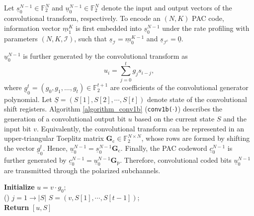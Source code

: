 \documentclass[12pt, draftclsnofoot, peerreview, onecolumn]{IEEEtran}
\theoremstyle{noparent}
\begin{document}
Let $\underline{s}_{0}^{N-1} \in \mathbb{F}_{2}^{N}$ and $\underline{u}_{0}^{N-1} \in \mathbb{F}_{2}^{N}$
denote the input and output vectors of the convolutional transform, respectively.
To encode an $(N,K)$ PAC code, information vector $\underline{m}_{1}^{K}$ is
first embedded into $\underline{s}_{0}^{N-1}$ under the rate profiling with 
parameters $(N,K,\mathcal{I})$, such that
$\underline{s}_{\mathcal{I}}=\underline{m}_{0}^{K-1}$ and $\underline{s}_{\mathcal{I}^c}=\underline{0}$.

$\underline{u}_{0}^{N-1}$ is further generated 
by the convolutional transform as 
\begin{equation}
    u_i=\sum_{j=0}^{t} g_j s_{i-j},
    \label{1_bit_convolutional}
\end{equation}
where $\underline{g}_{0}^{t}=\left(g_{0}, g_{1}, \ldots, g_{t}\right)\in \mathbb{F}_{2}^{t+1}$ 
are coefficients of the convolutional generator polynomial.
Let $\underline{S}=(S[1], S[2], \cdots, S[t])$ denote state of the convolutional shift registers.
Algorithm \ref{algorithm_conv1b} (\texttt{conv1b($\cdot$)}) describes the generation of 
a convolutional output bit $u$ based on the current state $S$ and the input bit $v$.
Equivalently, the convolutional transform can be represented in 
an upper-triangular Toeplitz matrix $\mathbf{G}_{\mathrm{c}}\in \mathbb{F}_{2}^{N \times N}$,
whose rows are formed by shifting the vector $\underline{g}_{0}^{t}$.
Hence, $\underline{u}_{0}^{N-1}=\underline{s}_{0}^{N-1} \mathbf{G}_{\mathrm{c}}$.
Finally, the PAC codeword $\underline{c}_{0}^{N-1}$ is further generated by
$\underline{c}_{0}^{N-1}=\underline{u}_{0}^{N-1} \mathbf{G}_{\mathrm{p}}$.
Therefore, convolutional coded bits $\underline{u}_{0}^{N-1}$ are transmitted
through the polarized subchannels.


\begin{algorithm}[t]
    \label{algorithm_conv1b}
    \caption{Generation of a single convolutional output bit, \texttt{conv1b($\cdot$)}}
    {\bf Initialize} $u=v\cdot g_0$;\\
    \For(){ $j=1\to |S|$}{
    }
    $S=(v,S[1], \cdots, S[t-1])$;\\
    {\bf Return} $[u, S]$\;
\end{algorithm}
\end{document}
